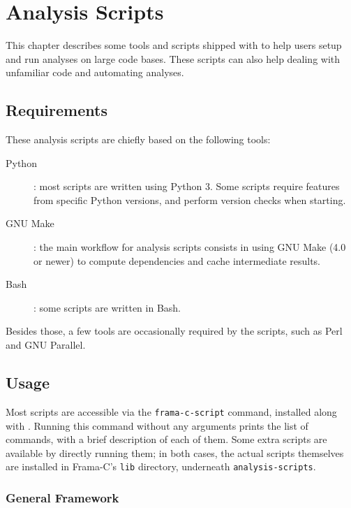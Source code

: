 
\chapter{Analysis Scripts}
\label{user-analysis-scripts}

This chapter describes some tools and scripts shipped with \FramaC to help
users setup and run analyses on large code bases. These scripts can also help
dealing with unfamiliar code and automating analyses.

\section{Requirements}

These analysis scripts are chiefly based on the following tools:

\begin{description}
\item[Python]: most scripts are written using Python 3. Some scripts require
  features from specific Python versions, and perform version checks when
  starting.
\item[GNU Make]: the main workflow for analysis scripts consists in using
  GNU Make (4.0 or newer) to compute dependencies and cache intermediate
  results.
\item[Bash]: some scripts are written in Bash.
\end{description}

Besides those, a few tools are occasionally required by the scripts, such as
Perl and GNU Parallel.

\section{Usage}

Most scripts are accessible via the \texttt{frama-c-script} command, installed
along with \FramaC. Running this command without any arguments prints the list
of commands, with a brief description of each of them. Some extra scripts are
available by directly running them; in both cases, the actual scripts
themselves are installed in Frama-C's \texttt{lib} directory, underneath
\texttt{analysis-scripts}.

\subsection{General Framework}


